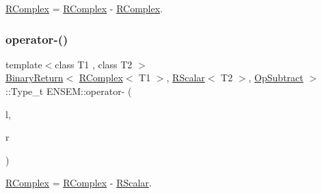\mbox{\hyperlink{classENSEM_1_1RComplex}{R\+Complex}} = \mbox{\hyperlink{classENSEM_1_1RComplex}{R\+Complex}} -\/ \mbox{\hyperlink{classENSEM_1_1RComplex}{R\+Complex}}. 

\mbox{\label{group__rcomplex_ga9ea00fde5e26657fc53ca42c40fa6618}} 
\subsubsection{\texorpdfstring{operator-\/()}{operator-()}\hspace{0.1cm}{\footnotesize\ttfamily [3/4]}}
{\footnotesize\ttfamily template$<$class T1 , class T2 $>$ \\
\mbox{\hyperlink{structENSEM_1_1BinaryReturn}{Binary\+Return}}$<$ \mbox{\hyperlink{classENSEM_1_1RComplex}{R\+Complex}}$<$ T1 $>$, \mbox{\hyperlink{classENSEM_1_1RScalar}{R\+Scalar}}$<$ T2 $>$, \mbox{\hyperlink{structENSEM_1_1OpSubtract}{Op\+Subtract}} $>$\+::Type\+\_\+t E\+N\+S\+E\+M\+::operator-\/ (\begin{DoxyParamCaption}\item[{const \mbox{\hyperlink{classENSEM_1_1RComplex}{R\+Complex}}$<$ T1 $>$ \&}]{l,  }\item[{const \mbox{\hyperlink{classENSEM_1_1RScalar}{R\+Scalar}}$<$ T2 $>$ \&}]{r }\end{DoxyParamCaption})\hspace{0.3cm}{\ttfamily [inline]}}



\mbox{\hyperlink{classENSEM_1_1RComplex}{R\+Complex}} = \mbox{\hyperlink{classENSEM_1_1RComplex}{R\+Complex}} -\/ \mbox{\hyperlink{classENSEM_1_1RScalar}{R\+Scalar}}. 

\mbox{\label{group__rcomplex_ga92f922f58ca43c5692f794ecb95dc1f5}} 

